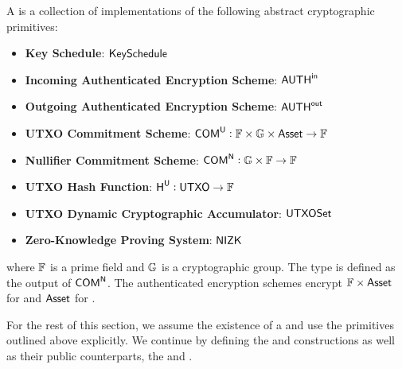 \begin{definition}
    A \TransferConfiguration{} is a collection of implementations of the following abstract cryptographic primitives:
    \begin{itemize}
        \item \textbf{Key Schedule}: ${\textsf{KeySchedule}}$
        \item \textbf{Incoming Authenticated Encryption Scheme}: ${{\textsf{AUTH}}^\textsf{in}}$
        \item \textbf{Outgoing Authenticated Encryption Scheme}: ${{\textsf{AUTH}}^\textsf{out}}$
        \item \textbf{UTXO Commitment Scheme}: ${\textsf{COM}}^{{\textsf{U}}} : {\mathbb{F}} \times {\mathbb{G}} \times {\textsf{Asset}} \to {\mathbb{F}}$
        \item \textbf{Nullifier Commitment Scheme}: ${\textsf{COM}}^{{\textsf{N}}} : {\mathbb{G}} \times {\mathbb{F}} \to {\mathbb{F}}$
        \item \textbf{UTXO Hash Function}: ${\textsf{H}}^{{\textsf{U}}} : {\textsf{UTXO}} \to {\mathbb{F}}$
        \item \textbf{UTXO Dynamic Cryptographic Accumulator}: ${\textsf{UTXOSet}}$
        \item \textbf{Zero-Knowledge Proving System}: ${\textsf{NIZK}}$
    \end{itemize}
    where ${\mathbb{F}}$ is a prime field and ${\mathbb{G}}$ is a cryptographic group. The \Nullifier{} type is defined as the output of ${\textsf{COM}}^{{\textsf{N}}}$. The authenticated encryption schemes encrypt ${\mathbb{F}} \times {\textsf{Asset}}$ for  and ${\textsf{Asset}}$ for .
\end{definition}

For the rest of this section, we assume the existence of a \TransferConfiguration{} and use the primitives outlined above explicitly. We continue by defining the \Sender{} and \Receiver{} constructions as well as their public counterparts, the \SenderPost{} and \ReceiverPost{}.

